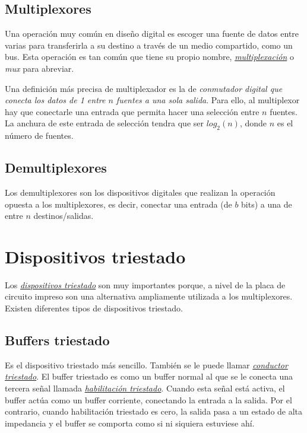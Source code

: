 \begin{itemize}
\subsection{Multiplexores}
Una operación muy común en diseño digital es escoger una fuente de datos entre varias para transferirla a su destino a través de un medio compartido, como un bus. Esta operación es tan común que tiene su propio nombre, \hyperlink{multiplexing}{\emph{multiplexación}} o \emph{mux} para abreviar.

Una definición más precisa de multiplexador es la de \textit{conmutador digital que conecta los datos de 1 entre $n$ fuentes a una sola salida}. Para ello, al multiplexor hay que conectarle una entrada que permita hacer una selección entre $n$ fuentes. La anchura de este entrada de selección tendra que ser $log_2(n)$, donde $n$ es el número de fuentes.



\subsection{Demultiplexores}
Los demultiplexores son los dispositivos digitales que realizan la operación opuesta a los multiplexores, es decir, conectar una entrada (de $b$ bits) a una de entre $n$ destinos/salidas.
\end{itemize}

\section{Dispositivos triestado}
Los \hyperlink{threestate_device}{\emph{dispositivos triestado}} son muy importantes porque, a nivel de la placa de circuito impreso son una alternativa ampliamente utilizada a los multiplexores. Existen diferentes tipos de dispositivos triestado.

\subsection{Buffers triestado}
Es el dispositivo triestado más sencillo. También se le puede llamar \hyperlink{threestate_driver}{\emph{conductor triestado}}. El buffer triestado es como un buffer normal al que se le conecta una tercera señal llamada \hyperlink{threestate_enable}{\emph{habilitación triestado}}. Cuando esta señal está activa, el buffer actúa como un buffer corriente, conectando la entrada a la salida. Por el contrario, cuando habilitación triestado es cero, la salida pasa a un estado de alta impedancia y el buffer se comporta como si ni siquiera estuviese ahí. 

